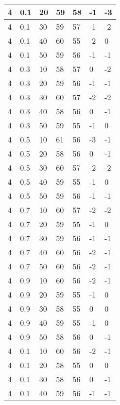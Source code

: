 \begin{longtable}{|l|l|l|l|l|l|l|}
		4     & 0.1 & 20   & 59 & 58 & -1  & -3  \\ \hline
		4     & 0.1 & 30   & 59 & 57 & -1  & -2  \\ \hline
		4     & 0.1 & 40   & 60 & 55 & -2  & 0   \\ \hline
		4     & 0.1 & 50   & 59 & 56 & -1  & -1  \\ \hline
		4     & 0.3 & 10   & 58 & 57 & 0   & -2  \\ \hline
		4     & 0.3 & 20   & 59 & 56 & -1  & -1  \\ \hline
		4     & 0.3 & 30   & 60 & 57 & -2  & -2  \\ \hline
		4     & 0.3 & 40   & 58 & 56 & 0   & -1  \\ \hline
		4     & 0.3 & 50   & 59 & 55 & -1  & 0   \\ \hline
		4     & 0.5 & 10   & 61 & 56 & -3  & -1  \\ \hline
		4     & 0.5 & 20   & 58 & 56 & 0   & -1  \\ \hline
		4     & 0.5 & 30   & 60 & 57 & -2  & -2  \\ \hline
		4     & 0.5 & 40   & 59 & 55 & -1  & 0   \\ \hline
		4     & 0.5 & 50   & 59 & 56 & -1  & -1  \\ \hline
		4     & 0.7 & 10   & 60 & 57 & -2  & -2  \\ \hline
		4     & 0.7 & 20   & 59 & 55 & -1  & 0   \\ \hline
		4     & 0.7 & 30   & 59 & 56 & -1  & -1  \\ \hline
		4     & 0.7 & 40   & 60 & 56 & -2  & -1  \\ \hline
		4     & 0.7 & 50   & 60 & 56 & -2  & -1  \\ \hline
		4     & 0.9 & 10   & 60 & 56 & -2  & -1  \\ \hline
		4     & 0.9 & 20   & 59 & 55 & -1  & 0   \\ \hline
		4     & 0.9 & 30   & 58 & 55 & 0   & 0   \\ \hline
		4     & 0.9 & 40   & 59 & 55 & -1  & 0   \\ \hline
		4     & 0.9 & 50   & 58 & 56 & 0   & -1  \\ \hline
		4     & 0.1 & 10   & 60 & 56 & -2  & -1  \\ \hline
		4     & 0.1 & 20   & 58 & 55 & 0   & 0   \\ \hline
		4     & 0.1 & 30   & 58 & 56 & 0   & -1  \\ \hline
		4     & 0.1 & 40   & 59 & 56 & -1  & -1  \\ \hline

\end{longtable}
